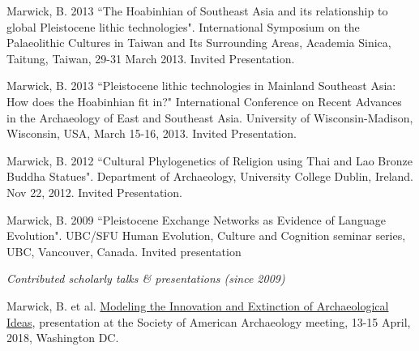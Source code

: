 \ind Marwick, B. 2013 ``The Hoabinhian of Southeast Asia and its relationship to global Pleistocene lithic technologies". International Symposium on the Palaeolithic Cultures in Taiwan and Its Surrounding Areas, Academia Sinica, Taitung, Taiwan, 29-31 March 2013.  Invited Presentation.

\ind Marwick, B. 2013 ``Pleistocene lithic technologies in Mainland Southeast Asia: How does the Hoabinhian fit in?"  International Conference on Recent Advances in the Archaeology of East and Southeast Asia. University of Wisconsin-Madison, Wisconsin, USA, March 15-16, 2013. Invited Presentation.

\ind Marwick, B. 2012 ``Cultural Phylogenetics of Religion using Thai and Lao Bronze Buddha Statues". Department of Archaeology, University College Dublin, Ireland. Nov 22, 2012. Invited Presentation.

\ind Marwick, B. 2009 ``Pleistocene Exchange Networks as Evidence of Language Evolution".  UBC/SFU Human Evolution, Culture and Cognition seminar series, UBC, Vancouver, Canada. Invited presentation

\bigskip



\noindent\emph{Contributed scholarly talks \& presentations (since 2009)\vspace{0.01in}}

\medskip

\ind Marwick, B. et al. \href{https://osf.io/tz6s5/}{Modeling the Innovation and Extinction of Archaeological Ideas}, presentation at the Society of American Archaeology meeting, 13-15 April, 2018, Washington DC.  


